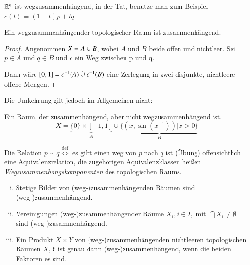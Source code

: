\documentclass[a4paper,10pt]{scrartcl}
\begin{document}
\begin{ex*}
$ \mathbb{R}^n $ ist wegzusammenhängend, in der Tat, benutze man zum Beispiel $ c(t)=(1-t)p+tq $.
\begin{figure}[H]
\centering
 \fixme[fig20]
\caption{}
\end{figure}
\end{ex*}
\begin{st}
Ein wegzusammenhängender topologischer Raum ist zusammenhängend.
\end{st}
\begin{proof}
Angenommen $ X=A\mathbin{\dot{\cup}} B $, wobei $ A $ und $ B $ beide offen und nichtleer.  Sei $ p\in A $ und $ q\in B $ und $ c $ ein Weg zwischen p und q. 
\begin{figure}[H]
\centering
 \fixme[fig21]
\caption{}
\end{figure}
Dann wäre $[0,1]=c^{-1}(A)\mathbin{\dot{\cup}} c^{-1}(B)$ eine Zerlegung in zwei disjunkte, nichtleere offene Mengen.
\end{proof}
Die Umkehrung gilt jedoch im Allgemeinen nicht:
\begin{ex*}
Ein Raum, der zusammenhängend, aber nicht \underline{weg}zusammenhängend ist.
\[
X=\underbrace{\{0\}\times [-1,1]}_{A}\cup\underbrace{\{(x, \sin(x^{-1}))|x>0\}}_{B}
\] 
\begin{figure}[H]
\centering
 \fixme[fig22]
\caption{}
\end{figure}
\end{ex*}
Die Relation $ p\sim q \stackrel{\text{def}}{\iff} $ es gibt einen weg von $ p $ nach $ q $ ist (Übung) offensichtlich eine Äquivalenzrelation, die zugehörigen Äquivalenzklassen heißen \emph{Wegzusammenhangskomponenten} des topologischen Raums.
\begin{st}
\begin{enumerate}[(i)]
\item Stetige Bilder von (weg-)zusammenhängenden Räumen sind (weg-)zusammenhängend.
\item Vereinigungen (weg-)zusammenhängender Räume $ X_i, i\in I, $ mit $ \bigcap X_i\neq \emptyset $ sind (weg-)zusammenhängend.
\item Ein Produkt $ X\times Y $ von (weg-)zusammenhängenden nichtleeren topologischen Räumen $ X,Y $ ist genau dann (weg-)zusammenhängend, wenn die beiden Faktoren es sind. 
\end{enumerate}
\end{st}
\end{document}
